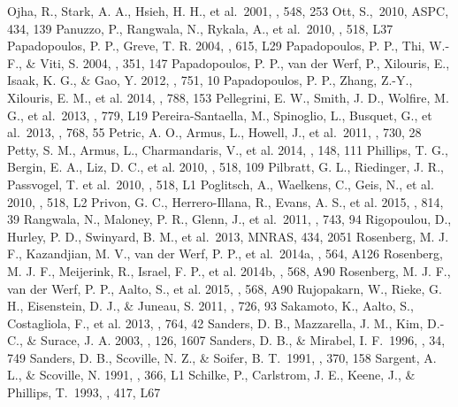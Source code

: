 \documentclass[preprint]{aastex}
\begin{document}
\begin{references}
 Ojha, R., Stark, A. A., Hsieh, H. H., et al.~2001, \apj, 548, 253
 Ott, S.,~2010, ASPC, 434, 139
 Panuzzo, P., Rangwala, N., Rykala, A., et al.~2010, \aap, 518, L37 
 Papadopoulos, P. P., Greve, T. R. 2004, \apj, 615, L29
 Papadopoulos, P. P., Thi, W.-F., \& Viti, S. 2004, \mnras, 351, 147
 Papadopoulos, P. P., van der Werf, P., Xilouris, E., Isaak, K. G., \& Gao, Y. 2012, \apj, 751, 10
 Papadopoulos, P. P., Zhang, Z.-Y., Xilouris, E. M., et al. 2014, \apj, 788, 153
 Pellegrini, E. W., Smith, J. D., Wolfire, M. G., et al.~2013, \apj, 779, L19
 Pereira-Santaella, M., Spinoglio, L., Busquet, G., et al.~2013, \apj, 768, 55
 Petric, A. O., Armus, L., Howell, J., et al.~2011, \apj, 730, 28
 Petty, S. M., Armus, L., Charmandaris, V., et al. 2014, \aj, 148, 111
 Phillips, T. G., Bergin, E. A., Liz, D. C., et al. 2010, \aap, 518, 109
 Pilbratt, G. L., Riedinger, J. R., Passvogel, T. et al.~2010, \aap, 518, L1
 Poglitsch, A., Waelkens, C., Geis, N., et al. 2010, \aap, 518, L2
 Privon, G. C., Herrero-Illana, R., Evans, A. S., et al. 2015, \apj, 814, 39
 Rangwala, N., Maloney, P. R., Glenn, J., et al.~2011, \apj, 743, 94
 Rigopoulou, D., Hurley, P. D., Swinyard, B. M., et al.~2013, MNRAS, 434, 2051
 Rosenberg, M. J. F., Kazandjian, M. V., van der Werf, P. P., et al.~2014a, \aap, 564, A126
 Rosenberg, M. J. F., Meijerink, R., Israel, F. P., et al. 2014b, \aap, 568, A90
 Rosenberg, M. J. F., van der Werf, P. P., Aalto, S., et al. 2015, \aap, 568, A90
 Rujopakarn, W., Rieke, G. H., Eisenstein, D. J., \& Juneau, S. 2011, \apj, 726, 93
 Sakamoto, K., Aalto, S., Costagliola, F., et al. 2013, \apj, 764, 42
 Sanders, D. B., Mazzarella, J. M., Kim, D.-C., \& Surace, J. A. 2003, \apj, 126, 1607
 Sanders, D. B., \& Mirabel, I. F.~1996, \araa, 34, 749 
 Sanders, D. B., Scoville, N. Z., \& Soifer, B. T.~1991, \apj, 370, 158 
 Sargent, A. L., \& Scoville, N. 1991, \apj, 366, L1
 Schilke, P., Carlstrom, J. E., Keene, J., \& Phillips, T.~1993, \apj, 417, L67

\end{references}
\end{document}
